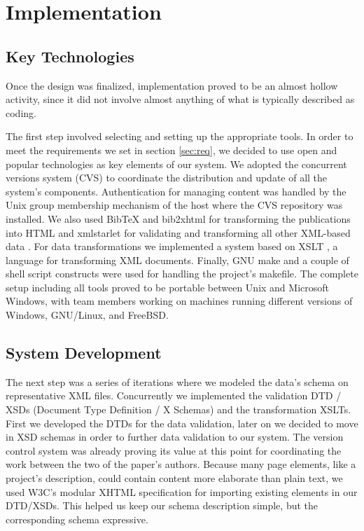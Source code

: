 \documentclass[10pt]{article}
\begin{document}
\section{Implementation}

\subsection{Key Technologies}

Once the design was finalized,
implementation proved to be an almost hollow activity,
since it did not involve almost anything of what
is typically described as coding.

The first step involved selecting and setting up the
appropriate tools. In order to meet the requirements we set in section \ref{sec:req}, 
we decided to use open and popular
technologies as key elements of our system.
We adopted the concurrent versions system
({\sc CVS}) \cite{BF01} \cite{CVS} to coordinate the distribution
and update of all the system's components.
Authentication for managing content was handled by the
Unix group membership mechanism of the host where the
{\sc CVS} repository was installed.
We also used
{\sc BibTeX} \cite{Pa88} \cite{Lam94} and {\sc bib2xhtml} \cite{BibXHMTL} for transforming the publications
into {\sc HTML} and
xmlstarlet \cite{Gru04} for validating and transforming
all other {\sc XML}-based data \cite{W3C_XML}.
For data transformations we 
implemented a system based on XSLT \cite{W3C_XSLT}, a language for transforming XML documents.
Finally, {\sc GNU} make \cite{gnu_make} and a couple of shell script
constructs were used for handling the project's makefile.
The complete setup including all tools proved to be portable
between Unix and Microsoft Windows, with team members working
on machines running different versions of {\sc Windows}, {\sc GNU/Linux},
and {\sc FreeBSD}.

\subsection{System Development}

The next step was a series of iterations where we
modeled the data's schema on representative {\sc XML}
files. Concurrently we implemented the validation {\sc DTD / XSDs} (Document Type Definition / X Schemas)
and the transformation {\sc XSLTs}. First we developed the {\sc DTDs}
for the data validation, later on we decided to move in {\sc XSD} schemas in order to
further data validation to our system.
The version control system was already proving its value
at this point
for coordinating the work between the two of the paper's authors.
Because many page elements, like a project's description,
could contain content more elaborate than plain text,
we used W3C's modular {\sc XHTML} specification for
importing existing elements in our {\sc DTD/XSDs}.
This helped us keep our schema description simple,
but the corresponding schema expressive.
\end{document}
